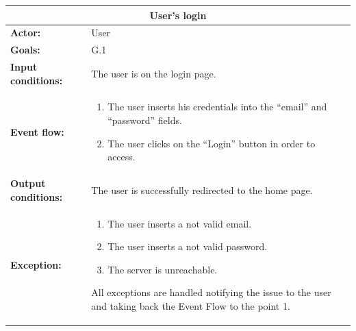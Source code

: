 \begin{tabular} { p{5cm} p{8cm} } 
\multicolumn{2}{c}{\textbf{User's login}}\\
\hline
\textbf{Actor:} & User \\ 
\textbf{Goals:} & G.1 \\ 
\textbf{Input conditions:} & The user is on the login page. \\
\textbf{Event flow:} & \begin{enumerate}
				\item
				The user inserts his credentials into the “email” and “password” fields.
				\item
				The user clicks on the “Login” button in order to access.
			\end{enumerate} \\ 
\textbf{Output conditions:} & The user is successfully redirected to the
home page.\\ 
\textbf{Exception:} & \begin{enumerate}
				\item
				The user inserts a not valid email.
				\item
				The user inserts a not valid password.
				\item
				The server is unreachable.
			\end{enumerate}
All exceptions are handled notifying the issue to the user and taking back the Event Flow to the point 1. \\
\hline
\end{tabular}


